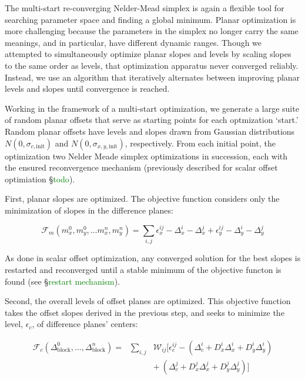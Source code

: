 \documentclass[iop]{emulateapj}
\newcommand{\todo}[1]{\textcolor{green}{#1}}
\begin{document}
The multi-start re-converging Nelder-Mead simplex is again a flexible tool for searching parameter space and finding a global minimum. Planar optimization is more challenging because the parameters in the simplex no longer carry the same meanings, and in particular, have different dynamic ranges. Though we attempted to simultaneously optimize planar slopes and levels by scaling slopes to the same order as levels, that optimization apparatus never converged reliably. Instead, we use an algorithm that iteratively alternates between improving planar levels and slopes until convergence is reached.

Working in the framework of a multi-start optimization, we generate a large suite of random planar offsets that serve as starting points for each optmization `start.' Random planar offsets have levels and slopes drawn from Gaussian distributions $N(0, \sigma_{c,\mathrm{init}})$ and $N(0, \sigma_{x,y,\mathrm{init}})$, respectively. From each initial point, the optimization two Nelder Meade simplex optimizations in succession, each with the ensured reconvergence mechanism (previously described for scalar offset optimiation \S \todo{todo}).

First, planar slopes are optimized. The objective function considers only the minimization of slopes in the difference planes:

\begin{equation}
	\mathcal{F}_m(m_x^0,m_y^0,\ldots m_x^n, m_y^n) = \sum_{i,j} \epsilon_x^{ij} - \Delta_x^i - \Delta_x^j + \epsilon_y^{ij} - \Delta_y^i - \Delta_y^j
\end{equation}

\noindent As done in scalar offset optimization, any converged solution for the best slopes is restarted and reconverged until a stable minimum of the objective functon is found (see \S \todo{restart mechanism}).

Second, the overall levels of offset planes are optimized. This objective function takes the offset slopes derived in the previous step, and seeks to minimize the level, $\epsilon_c$, of difference planes' centers:

\begin{eqnarray}\nonumber
	\mathcal{F}_c(\Delta_\mathrm{block}^0,\ldots,\Delta_\mathrm{block}^n) = &\sum_{i,j}& \mathcal{W}_{ij} [ \epsilon^{ij}_c - (\Delta_c^i + D_x^i\Delta_x^i + D_y^i\Delta_y^i) \\
	&& +~(\Delta_c^j + D_x^j\Delta_x^j + D_y^j\Delta_y^j) ]
\end{eqnarray}
\end{document}
